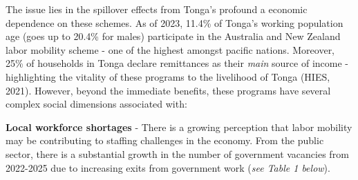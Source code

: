 \documentclass[9pt,a4paper,twocolumn,twoside]{tau-class/tau}
\begin{document}
    The issue lies in the spillover effects from Tonga's profound a economic dependence on these schemes. As of 2023, 11.4\% of Tonga’s working population age (goes up to 20.4\% for males) participate in the Australia and New Zealand labor mobility scheme - one of the highest amongst pacific nations. Moreover, 25\% of households in Tonga declare remittances as their \textit{main} source of income - highlighting the vitality of these programs to the livelihood of Tonga (HIES, 2021). However, beyond the immediate benefits, these programs have several complex social dimensions associated with:
    
    
    

   \textbf{Local workforce shortages} - 
   There is a growing perception that labor mobility may be contributing to staffing challenges in the economy. From the public sector, there is a substantial growth in the number of government vacancies from 2022-2025 due to increasing exits from government work (\textit{see Table 1 below}).
\end{document}
